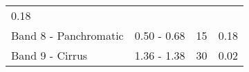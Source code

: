 \documentclass[]{book}
\begin{document}
\begin{longtable}[]{@{}llll@{}}
\begin{minipage}[t]{0.16\columnwidth}
0.18\strut
\end{minipage}\tabularnewline
\begin{minipage}[t]{0.36\columnwidth}\raggedright
Band 8 - Panchromatic\strut
\end{minipage} & \begin{minipage}[t]{0.18\columnwidth}\raggedright
0.50 - 0.68\strut
\end{minipage} & \begin{minipage}[t]{0.19\columnwidth}\raggedright
15\strut
\end{minipage} & \begin{minipage}[t]{0.16\columnwidth}\raggedright
0.18\strut
\end{minipage}\tabularnewline
\begin{minipage}[t]{0.36\columnwidth}\raggedright
Band 9 - Cirrus\strut
\end{minipage} & \begin{minipage}[t]{0.18\columnwidth}\raggedright
1.36 - 1.38\strut
\end{minipage} & \begin{minipage}[t]{0.19\columnwidth}\raggedright
30\strut
\end{minipage} & \begin{minipage}[t]{0.16\columnwidth}\raggedright
0.02\strut
\end{minipage}\tabularnewline
\bottomrule
\end{longtable}


\end{document}
